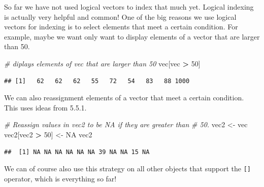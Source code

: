 \documentclass[
]{book}
\newenvironment{Shaded}{\begin{snugshade}}{\end{snugshade}}
\newcommand{\CommentTok}[1]{\textcolor[rgb]{0.56,0.35,0.01}{\textit{#1}}}
\newcommand{\DecValTok}[1]{\textcolor[rgb]{0.00,0.00,0.81}{#1}}
\newcommand{\NormalTok}[1]{#1}
\newcommand{\OperatorTok}[1]{\textcolor[rgb]{0.81,0.36,0.00}{\textbf{#1}}}
\newcommand{\OtherTok}[1]{\textcolor[rgb]{0.56,0.35,0.01}{#1}}
\newcommand{\StringTok}[1]{\textcolor[rgb]{0.31,0.60,0.02}{#1}}
\begin{document}
So far we have not used logical vectors to index that much yet. Logical indexing is actually very helpful and common! One of the big reasons we use logical vectors for indexing is to select elements that meet a certain condition. For example, maybe we want only want to display elements of a vector that are larger than 50.

\begin{Shaded}
\begin{Highlighting}[]
\CommentTok{# diplays elements of vec that are larger than 50}
\NormalTok{vec[vec }\OperatorTok{>}\StringTok{ }\DecValTok{50}\NormalTok{]}
\end{Highlighting}
\end{Shaded}

\begin{verbatim}
## [1]   62   62   62   55   72   54   83   88 1000
\end{verbatim}

We can also reassignment elements of a vector that meet a certain condition. This uses ideas from 5.5.1.

\begin{Shaded}
\begin{Highlighting}[]
\CommentTok{# Reassign values in vec2 to be NA if they are greater than}
\CommentTok{# 50.}
\NormalTok{vec2 <-}\StringTok{ }\NormalTok{vec}
\NormalTok{vec2[vec2 }\OperatorTok{>}\StringTok{ }\DecValTok{50}\NormalTok{] <-}\StringTok{ }\OtherTok{NA}
\NormalTok{vec2}
\end{Highlighting}
\end{Shaded}

\begin{verbatim}
##  [1] NA NA NA NA NA NA 39 NA NA 15 NA
\end{verbatim}

We can of course also use this strategy on all other objects that support the \texttt{{[}{]}} operator, which is everything so far!

\begin{Shaded}
\end{Shaded}
\end{document}
